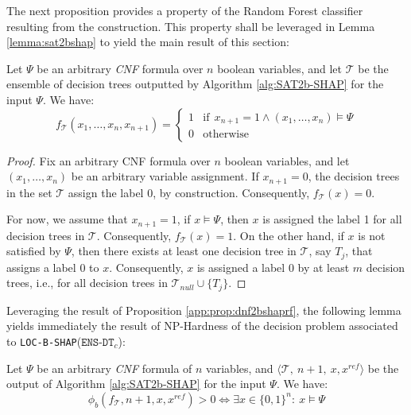 The next proposition provides a property of the Random Forest classifier resulting from the construction. This property shall be leveraged in Lemma \ref{lemma:sat2bshap} to yield the main result of this section:

\begin{proposition} \label{app:prop:dnf2bshaprf}
    Let $\Psi$ be an arbitrary \emph{CNF} formula over $n$ boolean variables, and let $\mathcal{T}$ be the ensemble of decision trees outputted by Algorithm \ref{alg:SAT2b-SHAP} for the input $\Psi$. 
    We have: 
    $$f_{\mathcal{T}}(x_{1}, \ldots, x_{n}, x_{n+1}) = \begin{cases}
          1 & \text{if} ~~ x_{n+1} = 1 \land (x_1 , \ldots, x_n) \models \Psi \\
          0 & \text{otherwise}
    \end{cases}$$   
\end{proposition}
\begin{proof}
  Fix an arbitrary CNF formula over $n$ boolean variables, and let $(x_{1}, \ldots, x_{n})$ be an arbitrary variable assignment. If $x_{n+1} = 0$, the decision trees in the set $\mathcal{T}$ assign the label $0$, by construction. Consequently, $f_{\mathcal{T}}(x) = 0$.

    For now, we assume that $x_{n+1} = 1$, if $x \models \Psi$, then $x$ is assigned the label 1 for all decision trees in $\mathcal{T}$. Consequently, $f_{\mathcal{T}}(x) = 1$. On the other hand, if $x$ is not satisfied by $\Psi$, then there exists at least one decision tree in $\mathcal{T}$, say $T_{j}$, that assigns a label 0 to $x$. Consequently, $x$ is assigned a label $0$ by at least $m$ decision trees, i.e., for all decision trees in $\mathcal{T}_{null}\cup\{T_{j}\}$.
\end{proof}

Leveraging the result of Proposition \ref{app:prop:dnf2bshaprf}, the following lemma yields immediately the result of NP-Hardness of the decision problem associated to \texttt{LOC-B-SHAP}($\texttt{ENS-DT}_{c}$):
\begin{lemma} \label{app:lemma:sat2bshap}
    Let $\Psi$ be an arbitrary \emph{CNF} formula of $n$ variables, and  $\langle\mathcal{T},~n+1,~x,x^{ref}\rangle$ be the output of Algorithm \ref{alg:SAT2b-SHAP} for the input $\Psi$. We have:
    $$\phi_{b}(f_{\mathcal{T}}, n+1, x, x^{ref}) > 0 \iff \exists x \in \{0,1\}^{n}: ~ x \models \Psi$$  
\end{lemma}

